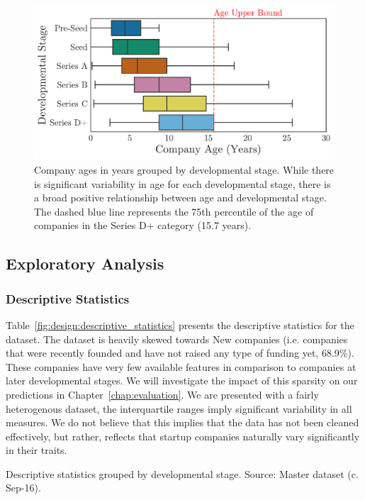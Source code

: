 \documentclass[../thesis/thesis.tex]{subfiles}
\begin{document}
\begin{figure}[!htb]
    \centering
    \includegraphics[width=\textwidth]{../figures/design/stages_ages}
    \caption[Company age distribution]{Company ages in years grouped by developmental stage. While there is significant variability in age for each developmental stage, there is a broad positive relationship between age and developmental stage. The dashed blue line represents the 75th percentile of the age of companies in the Series D+ category (15.7 years).}
    \label{fig:design:stages_ages}
\end{figure}

\subsection{Exploratory Analysis}

\subsubsection{Descriptive Statistics}

Table~\ref{fig:design:descriptive_statistics} presents the descriptive statistics for the dataset. The dataset is heavily skewed towards New companies (i.e. companies that were recently founded and have not raised any type of funding yet, 68.9\%). These companies have very few available features in comparison to companies at later developmental stages. We will investigate the impact of this sparsity on our predictions in Chapter~\ref{chap:evaluation}. We are presented with a fairly heterogenous dataset, the interquartile ranges imply significant variability in all measures. We do not believe that this implies that the data has not been cleaned effectively, but rather, reflects that startup companies naturally vary significantly in their traits.

\begin{table}[!htb]
    \centering
    \scalebox{0.9}{}
    \caption[Descriptive statistics]{Descriptive statistics grouped by developmental stage. Source: Master dataset (c. Sep-16).}
    \label{fig:design:descriptive_statistics}
\end{table}
\end{document}
